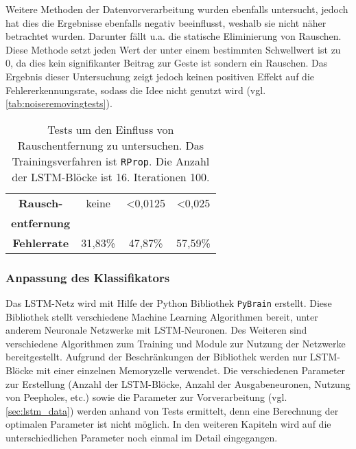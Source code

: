 Weitere Methoden der Datenvorverarbeitung wurden ebenfalls untersucht, jedoch
hat dies die Ergebnisse ebenfalls negativ beeinflusst, weshalb sie nicht näher
betrachtet wurden. Darunter fällt u.a. die statische Eliminierung von Rauschen.
Diese Methode setzt jeden Wert der unter einem bestimmten Schwellwert ist zu 0,
da dies kein signifikanter Beitrag zur Geste ist sondern ein Rauschen. Das
Ergebnis dieser Untersuchung zeigt jedoch keinen positiven Effekt auf die Fehlererkennungsrate, sodass die Idee nicht
genutzt wird (vgl. \autoref{tab:noiseremovingtests}).
 
\begin{table}[h]
\centering
\begin{tabular}{|c|c|c|c|}
\hline
\textbf{Rausch-} & keine & \textless 0,0125 & \textless 0,025\\
\textbf{entfernung}&&&\\
 \hline
\textbf{Fehlerrate}&31,83\%&47,87\%&57,59\%\\\hline
\end{tabular} 
\caption[Tests für Rauschentfernung]{Tests um den Einfluss von Rauschentfernung zu untersuchen. Das Trainingsverfahren ist \texttt{RProp}. Die Anzahl der LSTM-Blöcke ist 16. Iterationen 100.}
\label{tab:noiseremovingtests}
\end{table}
 
\subsubsection{Anpassung des Klassifikators}
Das \ac{LSTM}-Netz wird mit Hilfe der Python Bibliothek \texttt{PyBrain}
\cite{schaul2010} erstellt. Diese Bibliothek stellt verschiedene Machine
Learning Algorithmen bereit, unter anderem Neuronale Netzwerke mit
\ac{LSTM}-Neuronen. Des Weiteren sind verschiedene Algorithmen zum Training und
Module zur Nutzung der Netzwerke bereitgestellt. Aufgrund der Beschränkungen der
Bibliothek werden nur \ac{LSTM}-Blöcke mit einer einzelnen Memoryzelle
verwendet. Die verschiedenen Parameter zur Erstellung (Anzahl der
\ac{LSTM}-Blöcke, Anzahl der Ausgabeneuronen, Nutzung von Peepholes, etc.) sowie
die Parameter zur Vorverarbeitung (vgl. \autoref{sec:lstm_data}) werden anhand
von Tests ermittelt, denn eine Berechnung der optimalen Parameter ist nicht
möglich. In den weiteren Kapiteln wird auf die unterschiedlichen Parameter noch
einmal im Detail eingegangen. 


